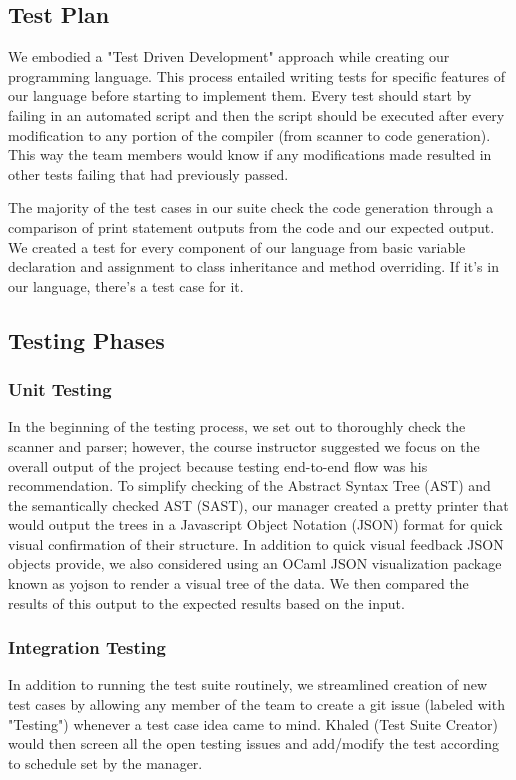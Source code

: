 \begin{homeworkProblem}
	\chapter{Test Plan}
	We embodied a "Test Driven Development" approach while creating our programming language. This process entailed writing tests for specific features of our language before starting to implement them. Every test should start by failing in an automated script and then the script should be executed after every modification to any portion of the compiler  (from scanner to code generation). This way the team members would know if any modifications made resulted in other tests failing that had previously passed. 
	
	The majority of the test cases in our suite check the code generation through a comparison of print statement outputs from the code and our expected output. We created a test for every component of our language from basic variable declaration and assignment to class inheritance and method overriding. If it's in our language, there's a test case for it.
	\section{Testing Phases}
	\subsection{Unit Testing}
	In the beginning of the testing process, we set out to thoroughly check the scanner and parser; however, the course instructor suggested we focus on the overall output of the project because testing end-to-end flow was his recommendation. To simplify checking of the Abstract Syntax Tree (AST) and the semantically checked AST (SAST), our manager created a pretty printer that would output the trees in a Javascript Object Notation (JSON) format for quick visual confirmation of their structure. In addition to quick visual feedback JSON objects provide, we also considered using an OCaml JSON visualization package known as yojson to render a visual tree of the data. We then compared the results of this output to the expected results based on the input.
	\subsection{Integration Testing}
	In addition to running the test suite routinely, we streamlined creation of new test cases by allowing any member of the team to create a git issue (labeled with "Testing") whenever a test case idea came to mind. Khaled (Test Suite Creator) would then screen all the open testing issues and add/modify the test according to schedule set by the manager.
	

\end{homeworkProblem}
